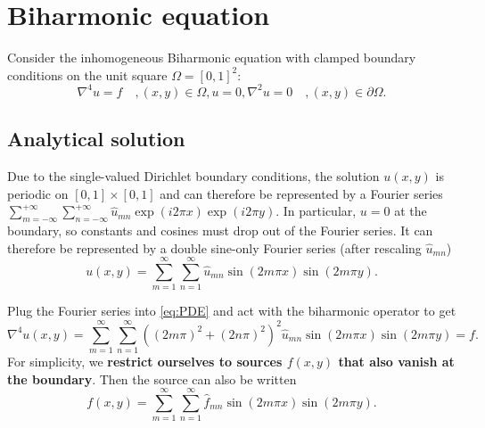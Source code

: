 \section{Biharmonic equation}
\label{sec:PDE}

\newtheorem{theorem}{Theorem}
\newtheorem{lemma}{Lemma}

Consider the inhomogeneous Biharmonic equation with clamped boundary conditions on the unit square $\Omega = [0, 1]^2$:
\begin{subequations}\label{eq:PDE}
  \begin{equation}
    \nabla^4 u = f \quad, (x, y) \in \Omega,
  \end{equation}
  \begin{equation}
    u = 0, \nabla^2u = 0 \quad, (x, y) \in \partial\Omega.
  \end{equation}
\end{subequations}

\subsection{Analytical solution}

Due to the single-valued Dirichlet boundary conditions, the solution $u(x,y)$ is periodic on $[0,1]\times[0,1]$ and can therefore be represented by a Fourier series $\sum_{m=-\infty}^{+\infty} \sum_{n=-\infty}^{+\infty} \hat{u}_{mn} \exp(i 2 \pi x) \exp(i 2 \pi y)$.
In particular, $u = 0$ at the boundary, so constants and cosines must drop out of the Fourier series.
It can therefore be represented by a double sine-only Fourier series (after rescaling $\hat{u}_{mn}$)
\newcommand{\fourierseries}[3]{
	\sum_{#2=1}^{\infty} \sum_{#3=1}^{\infty} #1 \sin(2 #2 \pi x) \sin(2 #2 \pi y)
}
\newcommand{\fourierexpand}[1]{
	\fourierseries{\hat{#1}_{mn}}{m}{n}
}
\begin{equation}
u(x,y) = \fourierexpand{u}.
\label{pde:equation:fourierexpansion}
\end{equation}

Plug the Fourier series into \cref{eq:PDE} and act with the biharmonic operator to get
\begin{equation*}
\nabla^4 u(x,y) = \fourierseries{((2m\pi)^2+(2n\pi)^2)^2 \hat{u}_{mn}}{m}{n} = f.
\end{equation*}
For simplicity, we \textbf{restrict ourselves to sources $f(x,y)$ that also vanish at the boundary}.
Then the source can also be written
\begin{equation}
	f(x,y) = \fourierexpand{f}.
\end{equation}

